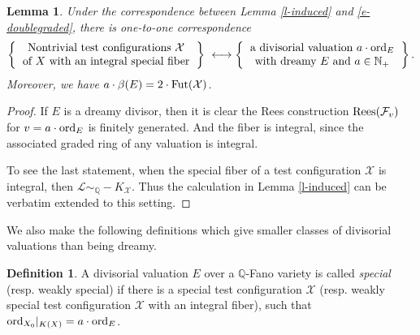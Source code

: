 \documentclass[12pt,reqno]{amsart}%
\newcommand{\cX}{{\mathcal{X}}}
\newcommand{\cL}{{\mathcal{L}}}
\newcommand{\cF}{\mathcal{F}}
\newcommand{\ord}{{\rm ord}}
\newtheorem{lem}[thm]{Lemma}
\theoremstyle{definition}
\newtheorem{defn}[thm]{Definition}
\theoremstyle{remark}
\newcommand{\Fut}{{\rm Fut}}
\begin{document}
\begin{lem}\label{l-integraldreamy}
Under the correspondence between Lemma \ref{l-induced} and  \eqref{e-doublegraded}, there is one-to-one correspondence 
 \[
\left\{
  \begin{tabular}{c}
\mbox{Nontrivial test configurations $\cX$}\\
of $X$ with an integral special fiber
  \end{tabular}
\right\} 
\ \longleftrightarrow
 \left\{
  \begin{tabular}{c}
\mbox{a divisorial valuation $a\cdot\ord_E$}\\
\mbox{with dreamy $E$ and $a\in \mathbb{N}_{+}$}\\
  \end{tabular}
\right\}.
\]
Moreover, we have
$a\cdot \beta(E)=2 \cdot \Fut(\cX)$.
\end{lem}
\begin{proof}If $ E$ is a dreamy divisor, then it is clear the Rees construction  ${\rm Rees}(\cF_v)$ for $v=a\cdot \ord_E$ is finitely generated. And the fiber is integral, since the associated graded ring of any valuation is integral. 

To see the last statement, when the special fiber of a test configuration $\cX$ is integral, then $\cL\sim_{\mathbb Q}-K_{\cX}$. Thus the calculation in Lemma \ref{l-induced} 
can be verbatim extended to this setting. 
\end{proof}

We also make the following definitions which give smaller classes of divisorial valuations than being dreamy. 
 \begin{defn}\label{d-specialdivisor}
 A divisorial valuation $E$ over a $\mathbb{Q}$-Fano variety is called {\it special} (resp. weakly special) if there is a special test configuration $\cX$ (resp. weakly special test configuration $\cX$ with an integral fiber), such that $\ord_{X_0}|_{K(X)}=a\cdot \ord_E$.  
 \end{defn}
\end{document}
